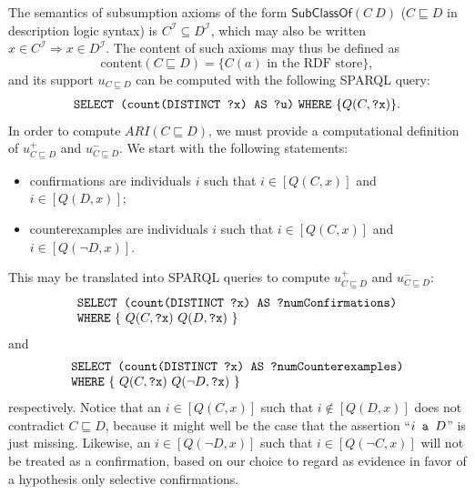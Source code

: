 \documentclass{llncs}
\begin{document}
The semantics of subsumption axioms of the form $\mathsf{SubClassOf}(C\ D)$
($C \sqsubseteq D$ in description logic syntax) is $C^\mathcal{I} \subseteq D^\mathcal{I}$,
which may also be written $x \in C^\mathcal{I} \Rightarrow x \in D^\mathcal{I}$. 
The content of such axioms may thus be defined as
\begin{equation}
  \mathrm{content}(C \sqsubseteq D) = \{\mbox{$C(a)$ in the RDF store} \},
\end{equation}
and its support $u_{C \sqsubseteq D}$ can be computed with the following SPARQL query:
\begin{equation}
  \begin{minipage}[c]{5in}
    \begin{tabbing}
      \quad\=\quad\=\quad\=\kill
      \texttt{SELECT (count(DISTINCT ?x) AS ?u)}
      \texttt{WHERE} \{$Q(C, \mbox{\tt ?x})$\}.
    \end{tabbing}
  \end{minipage}
\end{equation}
In order to compute $ARI(C \sqsubseteq D)$, we must provide a computational definition of $u^+_{C \sqsubseteq D}$ and $u^-_{C \sqsubseteq D}$. We start with the following statements:
\begin{itemize}
\item confirmations are individuals $i$ such that
  $i \in [Q(C, x)]$ and $i \in [Q(D, x)]$;
\item counterexamples are individuals $i$ such that
  $i \in [Q(C, x)]$ and $i \in [Q(\neg D, x)]$.
\end{itemize}
This may be translated into SPARQL queries to compute $u^+_{C \sqsubseteq D}$ and $u^-_{C \sqsubseteq D}$:
\begin{equation}
  \begin{minipage}[c]{5in}
    \begin{tabbing}
      \quad\=\quad\=\quad\=\kill
      \texttt{SELECT (count(DISTINCT ?x) AS ?numConfirmations)}\\
      \texttt{WHERE} \{ $Q(C, \mbox{\tt ?x})$ $Q(D, \mbox{\tt ?x})$ \}
    \end{tabbing}
  \end{minipage}
\end{equation}
and
\begin{equation}
  \begin{minipage}[c]{5in}
    \begin{tabbing}
      \quad\=\quad\=\quad\=\kill
      \texttt{SELECT (count(DISTINCT ?x) AS ?numCounterexamples)}\\
      \texttt{WHERE} \{ $Q(C, \mbox{\tt ?x})$ $Q(\neg D, \mbox{\tt ?x})$ \}
    \end{tabbing}
  \end{minipage}
\end{equation}
respectively.
Notice that an $i \in [Q(C, x)]$ such that $i \notin [Q(D, x)]$
does not contradict $C \sqsubseteq D$, because it might well be the case
that the assertion ``$i \mbox{\tt\ a } D$'' is just missing.
Likewise, an $i \in [Q(\neg D, x)]$ such that $i \in [Q(\neg C, x)]$
will not be treated as a confirmation, based on our choice to regard as
evidence in favor of a hypothesis only selective confirmations.
\end{document}
